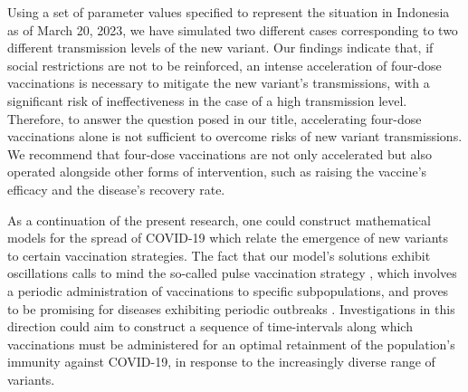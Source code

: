 \documentclass[11pt,reqno]{amsart}
\begin{document}
Using a set of parameter values specified to represent the situation in Indonesia as of March 20, 2023, we have simulated two different cases corresponding to two different transmission levels of the new variant. Our findings indicate that, if social restrictions are not to be reinforced, an intense acceleration of four-dose vaccinations is necessary to mitigate the new variant's transmissions, with a significant risk of ineffectiveness in the case of a high transmission level. Therefore, to answer the question posed in our title, accelerating four-dose vaccinations alone is not sufficient to overcome risks of new variant transmissions. We recommend that four-dose vaccinations are not only accelerated but also operated alongside other forms of intervention, such as raising the vaccine's efficacy and the disease's recovery rate.



As a continuation of the present research, one could construct mathematical models for the spread of COVID-19 which relate the emergence of new variants to certain vaccination strategies. The fact that our model's solutions exhibit oscillations calls to mind the so-called pulse vaccination strategy \cite{AgurCojocaruMazorAndersonDanon,dOnofrio,EarnRohaniGrenfell}, which involves a periodic administration of vaccinations to specific subpopulations, and proves to be promising for diseases exhibiting periodic outbreaks \cite{dOnofrio,EarnRohaniGrenfell}. Investigations in this direction could aim to construct a sequence of time-intervals along which vaccinations must be administered for an optimal retainment of the population's immunity against COVID-19, in response to the increasingly diverse range of variants.





\end{document}
